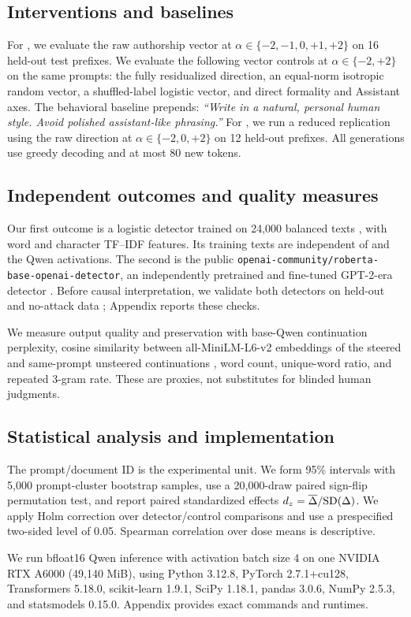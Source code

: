 \subsection{Interventions and baselines}

For \qweninst, we evaluate the raw authorship vector at $\alpha\in\{-2,-1,0,+1,+2\}$ on 16 held-out test prefixes. We evaluate the following vector controls at $\alpha\in\{-2,+2\}$ on the same prompts: the fully residualized direction, an equal-norm isotropic random vector, a shuffled-label logistic vector, and direct formality and Assistant axes. The behavioral baseline prepends: \emph{``Write in a natural, personal human style. Avoid polished assistant-like phrasing.''} For \qwenbase, we run a reduced replication using the raw direction at $\alpha\in\{-2,0,+2\}$ on 12 held-out prefixes. All generations use greedy decoding and at most 80 new tokens.

\subsection{Independent outcomes and quality measures}

Our first outcome is a logistic detector trained on 24,000 balanced \mage texts \cite{li2024mage}, with word and character TF--IDF features. Its training texts are independent of \hape and the Qwen activations. The second is the public \texttt{openai-community/roberta-base-openai-detector}, an independently pretrained and fine-tuned GPT-2-era detector \cite{openai2019detector}. Before causal interpretation, we validate both detectors on held-out \mage and no-attack \raid data \cite{dugan2024raid}; Appendix  reports these checks.

We measure output quality and preservation with base-Qwen continuation perplexity, cosine similarity between all-MiniLM-L6-v2 embeddings of the steered and same-prompt unsteered continuations \cite{reimers2019sentencebert}, word count, unique-word ratio, and repeated 3-gram rate. These are proxies, not substitutes for blinded human judgments.

\subsection{Statistical analysis and implementation}

The prompt/document ID is the experimental unit. We form 95\% intervals with 5,000 prompt-cluster bootstrap samples, use a 20,000-draw paired sign-flip permutation test, and report paired standardized effects $d_z=\overline{\Delta}/\mathrm{SD}(\Delta)$. We apply Holm correction over detector/control comparisons and use a prespecified two-sided level of 0.05. Spearman correlation over dose means is descriptive.

We run bfloat16 Qwen inference with activation batch size 4 on one NVIDIA RTX A6000 (49,140 MiB), using Python 3.12.8, PyTorch 2.7.1+cu128, Transformers 5.18.0, scikit-learn 1.9.1, SciPy 1.18.1, pandas 3.0.6, NumPy 2.5.3, and statsmodels 0.15.0. Appendix  provides exact commands and runtimes.

